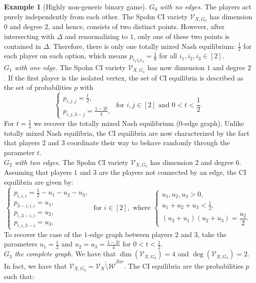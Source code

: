 \documentclass[11pt]{amsart}
\numberwithin{equation}{section}
\theoremstyle{plain}
\numberwithin{theorem}{section}
\theoremstyle{definition}
\newtheorem{example}[theorem]{Example}
\begin{document}
\begin{example}[{Highly non-generic binary game}]
\emph{$G_0$ with no edges.} The players act purely independently from each other. The Spohn CI variety $\mathcal V_{X,G_0}$ has dimension $0$ and degree $2$, and hence, consists of two distinct points. However, after intersecting with $\Delta$ and renormalizing to $1$, only one of these two points is contained in $\Delta$. Therefore, 
      there is only one totally mixed Nash equilibrium: $\frac12$ for each player on each option, which means $p_{i_1 i_2 i_3}=\frac18$ for all $i_1,i_2,i_3\in[2]$. \\ 
\indent \emph{$G_1$ with one edge.} The Spohn CI variety $\mathcal V_{X,G_1}$ has now dimension $1$ and degree $2$. If the first player is the isolated vertex, the set of CI equilibria is described as the set of probabilities $p$ with
      \[
        \left\{\begin{array}{l}
       \displaystyle p_{i,j,j} = \frac{t}{2},\\ \displaystyle
        p_{i,j,3-j} = \frac{1-2t}{4},
        \end{array}
        \right. \text{ for } i,j\in[2] \text{ and } 0<t<\frac{1}{2}.
      \]
For $t=\frac14$ we recover the totally mixed Nash equilibrium ($0$-edge graph).
Unlike totally mixed Nash equilibria, the CI equilibria are now characterized by the fact that players $2$ and $3$ coordinate their way to behave randomly through the parameter $t$.\\
\indent \emph{$G_2$ with two edges.} The Spohn CI variety $\mathcal V_{X,G_2}$ has dimension $2$ and degree $6$. Assuming that players $1$ and $3$ are the players not connected by an edge, the CI equilibria are given by: $$\left\{\begin{array}{l}
p_{i,i,i}=\frac12-u_1-u_2-u_3,\\
p_{3-i,i,i}=u_1,\\
p_{i,3-i,i}=u_2,\\
p_{i,i,3-i}=u_3,
\end{array}\right.\text{ for } i\in[2],\text{ where }\left\{\begin{array}{ll}
    u_1,u_2,u_3>0,\\ u_1+u_2+u_3<\frac12,\\ (u_2+u_1)(u_2+u_3)=\dfrac{u_2}2.
\end{array}\right.$$
To recover the case of the $1$-edge graph between players $2$ and $3$, take the parameters $u_1=\frac t2$ and $u_2=u_3=\frac{1-2t}4$ for $0<t<\frac12$.\\
\indent \emph{$G_3$ the complete graph.} We have that $\dim(\mathcal V_{X,G_3})=4$ and $\deg(\mathcal V_{X,G_3})=2$. In fact, we have that $\mathcal V_{X,G_3}=\overline{\mathcal V_X\setminus\mathcal W}^{Zar}$. The CI equilibria are the probabilities $p$ such that:

\end{example}
\end{document}
